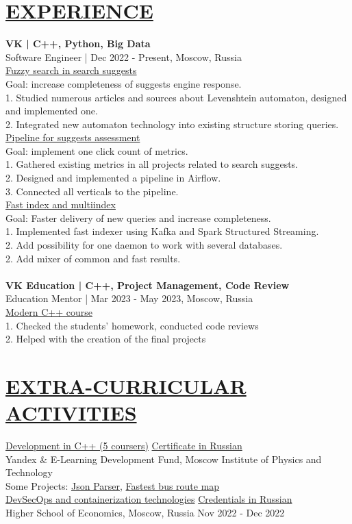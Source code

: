 \documentclass{resume} %
\begin{document}
\section*{\uline{EXPERIENCE \hfill}}
\textbf{VK | C++, Python, Big Data} \\
Software Engineer | Dec 2022 - Present, Moscow, Russia \\
\uline{Fuzzy search in search suggests}\\
Goal: increase completeness of suggests engine response.\\
1. Studied numerous articles and sources about Levenshtein automaton, designed and implemented one.\\
2. Integrated new automaton technology into existing structure storing queries.\\
\uline{Pipeline for suggests assessment}\\
Goal: implement one click count of metrics.\\
1. Gathered existing metrics in all projects related to search suggests.\\
2. Designed and implemented a pipeline in Airflow.\\
3. Connected all verticals to the pipeline.\\
\uline{Fast index and multiindex}\\
Goal: Faster delivery of new queries and increase completeness.\\
1. Implemented fast indexer using Kafka and Spark Structured Streaming.\\
2. Add possibility for one daemon to work with several databases.\\
2. Add mixer of common and fast results.\\
\\
\textbf{VK Education | C++, Project Management, Code Review}\\
Education Mentor | Mar 2023 - May 2023, Moscow, Russia\\
\uline{Modern C++ course}\\
1. Checked the students' homework, conducted code reviews\\
2. Helped with the creation of the final projects\\

\section*{\uline{EXTRA-CURRICULAR ACTIVITIES \hfill}}
\uline{Development in C++ (5 coursers)} \hfill \href{https://drive.google.com/file/d/1d1d4hC7YXxu3HGqzQ9vJUY29GPHpFAra/view?usp=sharing}{Certificate in Russian}\\
Yandex \& E-Learning Development Fund, Moscow Institute of Physics and Technology\\
Some Projects:
\href{https://github.com/pivasbulba/jsonparser}{Json Parser},
\href{https://github.com/pivasbulba/TransportDirectory}{Fastest bus route map} \\

\uline{DevSecOps and containerization technologies} \hfill \href{https://drive.google.com/file/d/11NyGWnh3GeXqrwNIw-2x_bBE39JUaymN}{Credentials in Russian}\\
Higher School of Economics, Moscow, Russia \hfill Nov 2022 - Dec 2022\\
\end{document}
